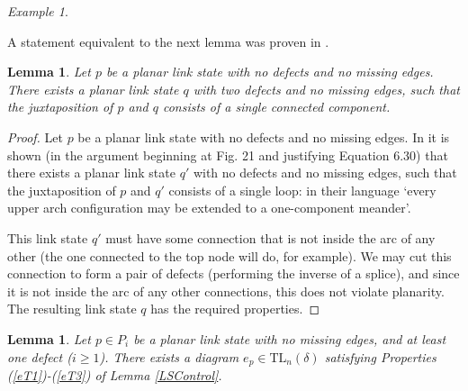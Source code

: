 \documentclass[12pt]{amsart}
\theoremstyle{plain}
\theoremstyle{definition} \newtheorem{definition}[theorem]{Definition}
\theoremstyle{plain}
\newtheorem{lemma}[theorem]{Lemma}
\theoremstyle{plain} \newtheorem{proposition}[theorem]{Proposition}
\theoremstyle{plain} \newtheorem{conjecture}[theorem]{Conjecture}
\theoremstyle{plain} \newtheorem{corollary}[theorem]{Corollary}
\theoremstyle{remark} \newtheorem{claim}[theorem]{Claim}
\theoremstyle{remark} \newtheorem{remark}[theorem]{Remark}
\theoremstyle{remark} \newtheorem{example}[theorem]{Example}
\theoremstyle{remark} \newtheorem{comment}[theorem]{Comment}
\theoremstyle{definition} \newtheorem{question}[theorem]{Question}
\newcommand{\TL}{\mathrm{TL}}
\newcommand{\mOne}{splice}
\begin{document}
\begin{example}
\begin{center}
\quad
\end{center} \end{example}

A statement equivalent to the next lemma was proven in \cite{FGG}.

\begin{lemma} \label{hardSingleTrundle} Let $p$ be a planar link state with no defects and no missing edges. There exists a planar link state $q$ with two defects and no missing edges, such that the juxtaposition of $p$ and $q$ consists of a single connected component. \end{lemma}

\begin{proof} Let $p$ be a planar link state with no defects and no missing edges. In \cite{FGG} it is shown (in the argument beginning at Fig. 21 and justifying Equation 6.30) that there exists a planar link state $q'$ with no defects and no missing edges, such that the juxtaposition of $p$ and $q'$ consists of a single loop: in their language `every upper arch configuration may be extended to a one-component meander'.

This link state $q'$ must have some connection that is not inside the arc of any other (the one connected to the top node will do, for example). We may cut this connection to form a pair of defects (performing the inverse of a \mOne), and since it is not inside the arc of any other connections, this does not violate planarity. The resulting link state $q$ has the required properties. \end{proof}

\begin{lemma} \label{hardTrundle} Let $p \in P_i$ be a planar link state with no missing edges, and at least one defect ($i \geq 1$). There exists a diagram $e_p \in \TL_n(\delta)$ satisfying Properties (\ref{eT1})-(\ref{eT3}) of Lemma \ref{LSControl}. \end{lemma}
\end{document}
